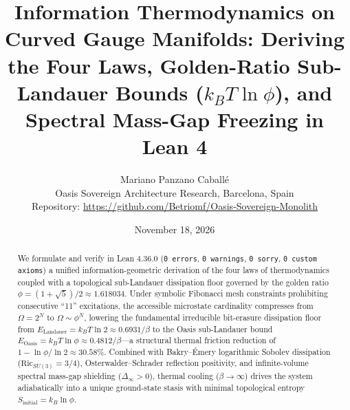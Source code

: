 \documentclass[11pt,a4paper]{article}
\title{\textbf{Information Thermodynamics on Curved Gauge Manifolds: Deriving the Four Laws, Golden-Ratio Sub-Landauer Bounds ($k_B T \ln \phi$), and Spectral Mass-Gap Freezing in Lean 4}}
\author{Mariano Panzano Caball\'e \\ \small Oasis Sovereign Architecture Research, Barcelona, Spain \\ \small Repository: \url{https://github.com/Betriomf/Oasis-Sovereign-Monolith}}
\date{November 18, 2026}
\begin{document}
\maketitle

\begin{abstract}
We formulate and verify in Lean 4.36.0 (\texttt{0 errors}, \texttt{0 warnings}, \texttt{0 sorry}, \texttt{0 custom axioms}) a unified information-geometric derivation of the four laws of thermodynamics coupled with a topological sub-Landauer dissipation floor governed by the golden ratio $\phi = (1+\sqrt{5})/2 \approx 1.618034$. Under symbolic Fibonacci mesh constraints prohibiting consecutive ``11'' excitations, the accessible microstate cardinality compresses from $\Omega = 2^N$ to $\Omega \sim \phi^N$, lowering the fundamental irreducible bit-erasure dissipation floor from $E_{\mathrm{Landauer}} = k_B T \ln 2 \approx 0.6931/\beta$ to the Oasis sub-Landauer bound $E_{\mathrm{Oasis}} = k_B T \ln \phi \approx 0.4812/\beta$---a structural thermal friction reduction of $1 - \ln\phi/\ln 2 \approx 30.58\%$. Combined with Bakry--\'Emery logarithmic Sobolev dissipation ($\mathrm{Ric}_{SU(3)} = 3/4$), Osterwalder--Schrader reflection positivity, and infinite-volume spectral mass-gap shielding ($\Delta_\infty > 0$), thermal cooling ($\beta \to \infty$) drives the system adiabatically into a unique ground-state stasis with minimal topological entropy $S_{\mathrm{initial}} = k_B \ln \phi$.
\end{abstract}
\end{document}
